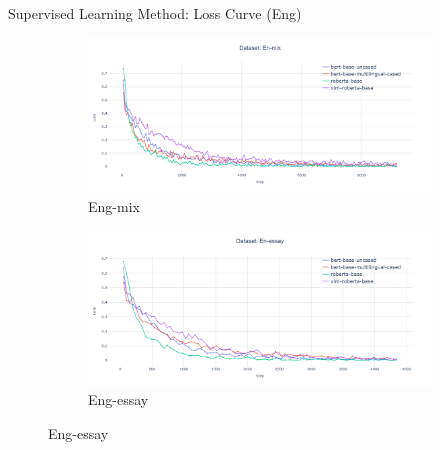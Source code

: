 \documentclass[serif]{beamer}
\begin{document}
\begin{frame}{Supervised Learning Method: Loss Curve (Eng)}
\begin{figure}[htbp]
    \centering
    \begin{subfigure}[b]{0.44\linewidth}
        \centering
        \includegraphics[width=\linewidth]{images/en_mix.png}
        \caption{Eng-mix}
        \label{fig:en-mix}
    \end{subfigure}
    \hfill
    \begin{subfigure}[b]{0.44\linewidth}
        \centering
        \includegraphics[width=\linewidth]{images/en_essay.png}
        \caption{Eng-essay}
        \label{fig:en-essay}
    \end{subfigure}

    \vspace{-0.2em}  %


\end{figure}
\end{frame}
\end{document}
